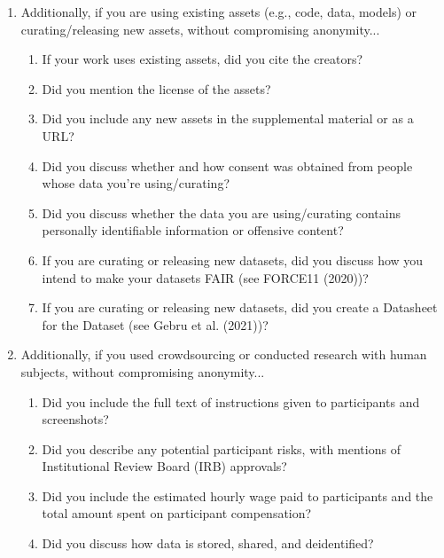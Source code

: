\begin{enumerate}
\begin{enumerate}
\end{enumerate}
\item Additionally, if you are using existing assets (e.g., code, data, models) or curating/releasing new assets, without compromising anonymity...
\begin{enumerate}
\item If your work uses existing assets, did you cite the creators? \ChecklistTBD
\item Did you mention the license of the assets? \ChecklistTBD
\item Did you include any new assets in the supplemental material or as a URL? \ChecklistTBD
\item Did you discuss whether and how consent was obtained from people whose data you're using/curating? \ChecklistTBD
\item Did you discuss whether the data you are using/curating contains personally identifiable information or offensive content? \ChecklistTBD
\item If you are curating or releasing new datasets, did you discuss how you intend to make your datasets FAIR (see FORCE11 (2020))? \ChecklistTBD
\item If you are curating or releasing new datasets, did you create a Datasheet for the Dataset (see Gebru et al. (2021))? \ChecklistTBD
\end{enumerate}
\item Additionally, if you used crowdsourcing or conducted research with human subjects, without compromising anonymity...
\begin{enumerate}
\item Did you include the full text of instructions given to participants and screenshots? \ChecklistTBD
\item Did you describe any potential participant risks, with mentions of Institutional Review Board (IRB) approvals? \ChecklistTBD
\item Did you include the estimated hourly wage paid to participants and the total amount spent on participant compensation? \ChecklistTBD
\item Did you discuss how data is stored, shared, and deidentified? \ChecklistTBD
\end{enumerate}
\end{enumerate}
